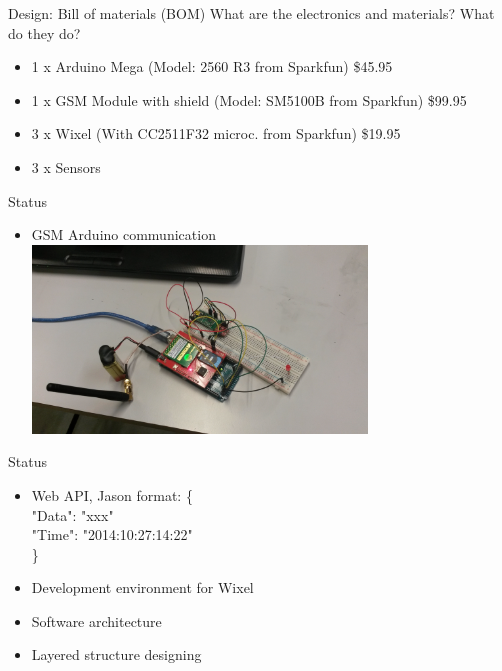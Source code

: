 \documentclass{beamer}
\begin{document}
\begin{frame}{Design: Bill of materials (BOM)}
What are the electronics and materials?  What do they do? 

\begin{itemize}
\item 1 x Arduino Mega (Model: 2560 R3 from Sparkfun) \$45.95
\item 1 x GSM Module with shield  (Model: SM5100B from Sparkfun) \$99.95
\item 3 x Wixel   (With CC2511F32 microc. from Sparkfun) \$19.95
\item 3 x Sensors
\end{itemize}
\end{frame}

\begin{frame}{Status}
\begin{itemize}
\item GSM Arduino communication\\
\includegraphics[height=5cm]{graphics/gsmArduino.jpg}
\end{itemize}

\end{frame}

\begin{frame}{Status}
\begin{itemize}
\item Web API, Jason format:
	\{\\
		"Data": "xxx"\\
		"Time": "2014:10:27:14:22"\\
	\}
\item Development environment for Wixel
\item Software architecture
\item Layered structure designing
\end{itemize}
\end{frame}
\end{document}
